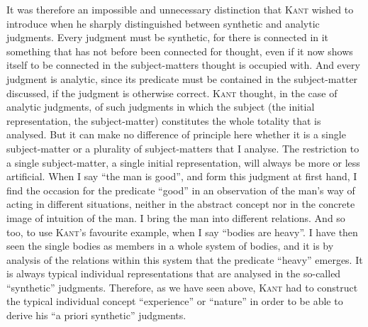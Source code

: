 \documentclass[12pt]{book}
\begin{document}
It was therefore an impossible and unnecessary distinction that \textsc{Kant}
wished to introduce when he sharply distinguished between synthetic and analytic
judgments. Every judgment must be synthetic, for there is connected in it
something that has not before been connected for thought, even if it now shows
itself to be connected in the subject-matters thought is occupied with. And every
judgment is analytic, since its predicate must be contained in the subject-matter
discussed, if the judgment is otherwise correct. \textsc{Kant} thought, in the
case of analytic judgments, of such judgments in which the subject (the initial
representation, the subject-matter) constitutes the whole totality that is
analysed. But it can make no difference of principle here whether it is a single
subject-matter or a plurality of subject-matters that I analyse. The restriction
to a single subject-matter, a single initial representation, will always be more
or less artificial. When I say ``the man is good'', and form this judgment at
first hand, I find the occasion for the predicate ``good'' in an observation of
the man's way of acting in different situations, neither in the abstract concept
nor in the concrete image of intuition of the man. I bring the man into different
relations. And so too, to use \textsc{Kant}'s favourite example, when I say
``bodies are heavy''. I have then seen the single bodies as members in a whole
system of bodies, and it is by analysis of the relations within this system that
the predicate ``heavy'' emerges. It is always typical individual representations
that are analysed in the so-called ``synthetic'' judgments. Therefore, as we have
seen above, \textsc{Kant} had to construct the typical individual concept
``experience'' or ``nature'' in order to be able to derive his ``a priori
synthetic'' judgments.
\end{document}
